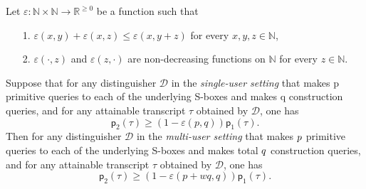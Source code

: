 \begin{lemma}
	\label{lemma:point-wise}
	
	Let $\varepsilon : \mathbb{N} \times \mathbb{N} \rightarrow \mathbb{R}^{\geq 0}$ be a function such that
	\begin{itemize}
		\item[1.] $\varepsilon (x, y) + \varepsilon (x, z) \leq \varepsilon (x, y + z)$ for every $x, y, z \in \mathbb{N}$,
		\item[2.] $\varepsilon (\cdot, z)$ and $\varepsilon (z, \cdot)$ are non-decreasing functions on $\mathbb{N}$ for every $z \in \mathbb{N}$.
	\end{itemize}
	Suppose that for any distinguisher $\mathcal{D}$ in the {\it single-user setting} that makes p primitive queries to each of the underlying S-boxes and makes q construction queries, and for any attainable transcript $\tau$ obtained by $\mathcal{D}$, one has
	$$
	\mathsf{p}_{2}(\tau) \geq (1 - \varepsilon(p,q)) \mathsf{p}_{1}(\tau).
	$$
	Then for any distinguisher $\mathcal{D}$ in the {\it multi-user setting} that makes $\mathnormal{p}$ primitive queries to each of the underlying S-boxes and makes total $\mathnormal{q}$ construction queries, and for any attainable transcript $\tau$ obtained by $\mathcal{D}$, one has
	$$
	\mathsf{p}_{2}(\tau) \geq (1 - \varepsilon(p + wq,q)) \mathsf{p}_{1}(\tau).
	$$
\end{lemma}



%
%
%
%
%
%

